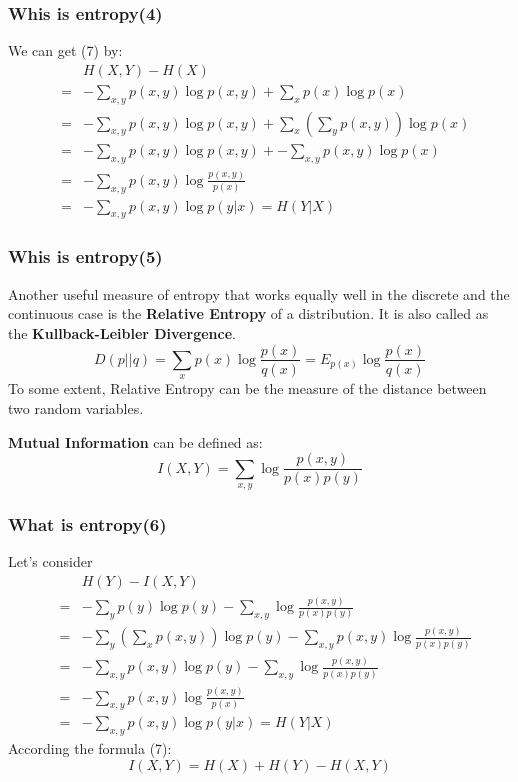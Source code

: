 \documentclass[slidestop,compress,mathserif]{beamer}
\begin{document}
	\begin{frame}[shrink]	
		\frametitle{Whis is entropy(4)}
		We can get (7) by:
		\begin{eqnarray*}
			&& H(X,Y)-H(X) \\
			&=& -\sum_{x,y}p(x,y)\log p(x,y) + \sum_x p(x)\log p(x)\\
			&=& -\sum_{x,y}p(x,y)\log p(x,y) + \sum_x\left(\sum_y p(x,y)\right)\log p(x)\\
			&=& -\sum_{x,y}p(x,y)\log p(x,y)+ -\sum_{x,y}p(x,y)\log p(x)\\
			&=& -\sum_{x,y}p(x,y)\log\frac{p(x,y)}{p(x)}\\
			&=& -\sum_{x,y} p(x,y)\log p(y|x) = H(Y|X)
		\end{eqnarray*}

	\end{frame}
	
	\begin{frame}
		\frametitle{Whis is entropy(5)}
		Another useful measure of entropy that works equally well in the discrete and the continuous case is the \textbf{Relative Entropy} of a distribution. It is also called as the \textbf{Kullback-Leibler Divergence}.
		$$D(p||q) = \sum_x p(x)\log \frac{p(x)}{q(x)} = E_{p(x)}\log\frac{p(x)}{q(x)}$$
		To some extent, Relative Entropy can be the measure of the distance between two random variables.
		
		\textbf{Mutual Information} can be defined as:
		$$I(X,Y)=\sum_{x,y}\log\frac{p(x,y)}{p(x)p(y)}$$
	\end{frame}
	
	\begin{frame}[shrink]
		\frametitle{What is entropy(6)}
		Let's consider
		\begin{eqnarray*}
			&& H(Y)-I(X,Y)  \\
			&=& -\sum_y p(y)\log p(y) - \sum_{x,y}\log\frac{p(x,y)}{p(x)p(y)} \\
			&=& -\sum_y\left(\sum_x p(x,y)\right)\log p(y) - \sum_{x,y}p(x,y)\log\frac{p(x,y)}{p(x)p(y)} \\
			&=& -\sum_{x,y}p(x,y)\log p(y) - \sum_{x,y}\log\frac{p(x,y)}{p(x)p(y)} \\
			&=& -\sum_{x,y}p(x,y)\log\frac{p(x,y)}{p(x)} \\
			&=& -\sum_{x,y}p(x,y)\log p(y|x) = H(Y|X)
		\end{eqnarray*}
		According the formula (7):
		$$I(X,Y) = H(X)+H(Y)-H(X,Y)$$
	\end{frame}
\end{document}
